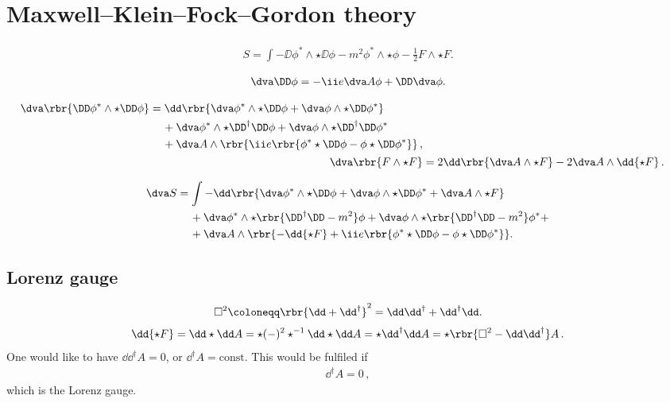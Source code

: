 \documentclass[a4paper]{article}
\numberwithin{equation}{section}
\begin{document}
\section{Maxwell--Klein--Fock--Gordon theory}

\begin{align}
S = \int -\DD\phi^*\wedge\star\DD\phi - m^2 \phi^*\wedge\star\phi
	-\frac{1}{2} F \wedge \star F.
\end{align}

\begin{align}
\dva \DD\phi = -\ii e \dva A\phi + \DD \dva \phi.
\end{align}

\begin{align}
\begin{split}
\dva\rbr{\DD \phi^*\wedge\star\DD\phi} &= 
\dd\rbr{\dva\phi^*\wedge\star\DD\phi + \dva\phi\wedge\star\DD\phi^*}
\\
&\quad\,+
\dva\phi^*\wedge\star\DD^{\dagger}\DD\phi +
\dva\phi\wedge\star\DD^{\dagger}\DD\phi^*
\\
&\quad\,+
\dva A \wedge\rbr{\ii e \rbr{\phi^* \star\DD\phi - \phi\star\DD\phi^*}}\,,
\end{split}
\\
\dva\rbr{F\wedge\star F} &=
	2 \dd\rbr{\dva A \wedge \star F} - 2 \dva A \wedge \dd {\star F}\,.
\end{align}

\begin{align}
\dva S &= \int -\dd\rbr{\dva\phi^*\wedge\star\DD\phi + \dva\phi\wedge\star\DD\phi^* + \dva A \wedge\star F}
\nonumber \\
&\quad\,+
\dva\phi^*\wedge\star\rbr{\DD^{\dagger}\DD-m^2}\phi +
\dva\phi\wedge\star\rbr{\DD^{\dagger}\DD-m^2}\phi^* +
\nonumber \\
&\quad\,+
\dva A\wedge\rbr{-\dd{\star F} +
	\ii e \rbr{\phi^* \star\DD\phi - \phi \star\DD\phi^*}}.
\end{align}

\subsection{Lorenz gauge}

\begin{align}
\square^2 \coloneqq \rbr{\dd + \dd^{\dagger}}^2 = \dd \dd^{\dagger} + \dd^{\dagger} \dd.
\end{align}
\begin{align}
\dd{\star F} = \dd\star \dd A = \star (-)^2 \star^{-1}\dd\star\dd A = \star \dd^{\dagger} \dd A = \star\rbr{\square^2 - \dd \dd^{\dagger}} A\,.
\end{align}
One would like to have $\dd \dd^{\dagger} A = 0$, or $\dd^{\dagger} A = \text{const}$. This would be fulfiled if
\begin{align}
\dd^{\dagger} A = 0\,,
\end{align}
which is the Lorenz gauge\cite{Lorenz1867,Bladel1991a,Bladel1991b}.
\end{document}
